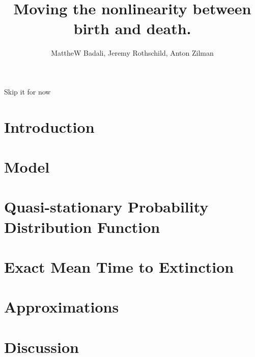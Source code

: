 \documentclass[a4paper,10pt]{article}
\title{Moving the nonlinearity between birth and death.}
\author{MattheW Badali, Jeremy Rothschild, Anton Zilman}
\numberwithin{equation}{section} %
\begin{document}
\maketitle

Skip it for now

\section{Introduction}



\section{Model}



\section{Quasi-stationary Probability Distribution Function}



\section{Exact Mean Time to Extinction}%



\section{Approximations}



\section{Discussion}





\end{document}
